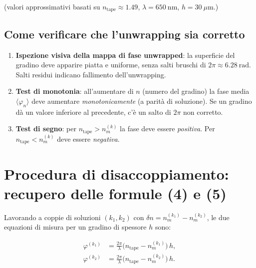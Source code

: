 \noindent (valori approssimativi basati su $n_\text{tape} \approx 1.49$,
$\lambda = 650\ \text{nm}$, $h = 30\ \mu\text{m}$.)

\subsection{Come verificare che l'unwrapping sia corretto}

\begin{enumerate}
  \item \textbf{Ispezione visiva della mappa di fase unwrapped}: la superficie
        del gradino deve apparire piatta e uniforme, senza salti bruschi di
        $2\pi \approx 6.28\ \text{rad}$. Salti residui indicano fallimento
        dell'unwrapping.

  \item \textbf{Test di monotonia}: all'aumentare di $n$ (numero del gradino)
        la fase media $\langle\varphi_n\rangle$ deve aumentare \textit{monotonicamente}
        (a parità di soluzione). Se un gradino dà un valore inferiore al precedente,
        c'è un salto di $2\pi$ non corretto.

  \item \textbf{Test di segno}: per $n_\text{tape} > n_m^{(k)}$ la fase deve essere
        \textit{positiva}. Per $n_\text{tape} < n_m^{(k)}$ deve essere \textit{negativa}.
        \color{red!70!black}{Per la soluzione all'80\%, se siete vicini al matching, la fase dovrebbe
        essere vicina a zero con segno determinato dall'ordinamento degli indici.}
\end{enumerate}

\section{Procedura di disaccoppiamento: recupero delle formule (4) e (5)}

Lavorando a coppie di soluzioni $(k_1, k_2)$ con $\delta n = n_m^{(k_1)} - n_m^{(k_2)}$,
le due equazioni di misura per un gradino di spessore $h$ sono:

\begin{align}
  \varphi^{(k_1)} &= \frac{2\pi}{\lambda}
    \bigl(n_\text{tape} - n_m^{(k_1)}\bigr)\,h,
  \label{eq:phi1} \\[6pt]
  \varphi^{(k_2)} &= \frac{2\pi}{\lambda}
    \bigl(n_\text{tape} - n_m^{(k_2)}\bigr)\,h.
  \label{eq:phi2}
\end{align}

